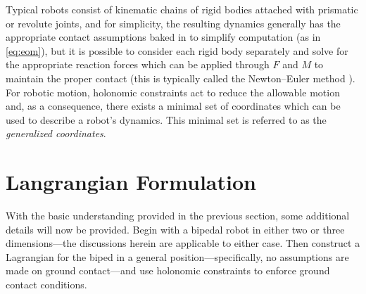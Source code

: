 
Typical robots consist of kinematic chains of rigid bodies attached with
prismatic or revolute joints, and for simplicity, the resulting dynamics
generally has the appropriate contact assumptions baked in to simplify
computation (as in \eqref{eq:eom}), but it is possible to consider
each rigid body separately and solve for the appropriate reaction forces which
can be applied through $F$ and $M$ to maintain the proper contact (this is
typically called the Newton--Euler method \cite{Hollerbach1980}).
%
For robotic motion, holonomic constraints act to reduce the allowable motion
and, as a consequence, there exists a minimal set of coordinates which can be
used to describe a robot's dynamics.
%
This minimal set is referred to as the {\em generalized coordinates}.


\section{Langrangian Formulation}

%
%

With the basic understanding provided in the previous section, some additional
details will now be provided.
%
Begin with a bipedal robot in either two or three dimensions---the discussions
herein are applicable to either case.
%
Then construct a Lagrangian for the biped in a general position---specifically,
no assumptions are made on ground contact---and use holonomic constraints to
enforce ground contact conditions.

